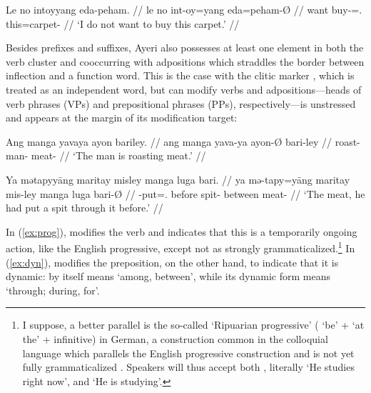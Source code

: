 \ex\begingl
	\gla Le no intoyyang eda-peham. //
	\glb le no int-oy=yang eda=peham-Ø //
	\glc \PatTI{} want buy-\Neg{}=\Fsg{}.\Aarg{} this=carpet-\Top{} //
	\glft `I do not want to buy this carpet.' //
\endgl\xe

Besides prefixes and suffixes, Ayeri also possesses at least one element in
both the verb cluster and cooccurring with adpositions which straddles the
border between inflection and a function word. This is the case with the clitic
marker , which is treated as an independent word, but can
modify verbs and adpositions---heads of verb phrases (VPs) and prepositional
phrases (PPs), respectively---is unstressed and appears at the margin of its
modification target:

\pex
\a\label{ex:prog}\begingl
	\gla Ang manga yavaya ayon bariley. //
	\glb ang manga yava-ya ayon-Ø bari-ley //
	\glc \AgtT{} \Prog{} roast-\TsgM{} man-\Top{} meat-\PargI{} //
	\glft `The man is roasting meat.' //
\endgl

\a\label{ex:dyn}\begingl
	\gla Ya mətapyyāng maritay misley manga luga bari. //
	\glb ya mə-tapy=yāng maritay mis-ley manga luga bari-Ø //
	\glc \LocT{} \Pst{}-put=\TsgM{}.\Aarg{} before spit-\PargI{} \Dyn{} 
		between meat-\Top{} //
	\glft `The meat, he had put a spit through it before.' //
\endgl

\xe

In (\ref{ex:prog}),  modifies the verb 
and indicates that this is a temporarily ongoing action, like the English
progressive, except not as strongly grammaticalized.\footnote{I suppose, a
better parallel is the so-called  `Ripuarian
progressive' ( `be' +  `at the' + infinitive) in German, a
construction common in the colloquial language which parallels the English
progressive construction and is not yet fully grammaticalized
\citep[435]{dudengram2016}. Speakers will thus accept both , literally `He studies right now', and  `He is
studying'.
% 
}
%
In (\ref{ex:dyn}),  modifies the preposition, on the other 
hand, to indicate that it is dynamic:  by itself means `among, 
between', while its dynamic form  means `through; 
during, for'.

